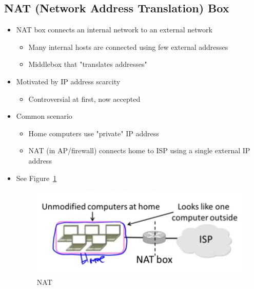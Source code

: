 \documentclass[12pt]{ctexart}   %
\begin{document}
	\subsection{NAT (Network Address Translation) Box}
	\begin{itemize}
		\item NAT box connects an internal network to an external network
		\begin{itemize}
			\item Many internal hosts are connected using few external addresses
			\item Middlebox that "translates addresses"
		\end{itemize}
		
		\item Motivated by IP address scarcity
		\begin{itemize}
			\item Controversial at first, now accepted
		\end{itemize}
		
		\item Common scenario
		\begin{itemize}
			\item Home computers use "private" IP address
			\item NAT (in AP/firewall) connects home to ISP using a single external IP address
		\end{itemize}
		\item See Figure~\ref{fig:4-10-3}
		
		\begin{figure}[h!] %
		\centering
		 \includegraphics[scale=0.7]{images/4-10-3}
		\caption{ NAT }
		 \label{fig:4-10-3}
		 \end{figure}
	\end{itemize}
	
\end{document}
